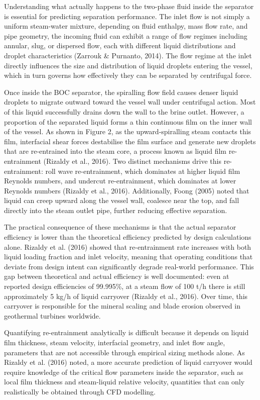 Understanding what actually happens to the two-phase fluid inside the separator is essential for predicting separation performance. The inlet flow is not simply a uniform steam-water mixture, depending on fluid enthalpy, mass flow rate, and pipe geometry, the incoming fluid can exhibit a range of flow regimes including annular, slug, or dispersed flow, each with different liquid distributions and droplet characteristics (Zarrouk \& Purnanto, 2014). The flow regime at the inlet directly influences the size and distribution of liquid droplets entering the vessel, which in turn governs how effectively they can be separated by centrifugal force.

Once inside the BOC separator, the spiralling flow field causes denser liquid droplets to migrate outward toward the vessel wall under centrifugal action. Most of this liquid successfully drains down the wall to the brine outlet. However, a proportion of the separated liquid forms a thin continuous film on the inner wall of the vessel. As shown in Figure 2, as the upward-spiralling steam contacts this film, interfacial shear forces destabilise the film surface and generate new droplets that are re-entrained into the steam core, a process known as liquid film re-entrainment (Rizaldy et al., 2016). Two distinct mechanisms drive this re-entrainment: roll wave re-entrainment, which dominates at higher liquid film Reynolds numbers, and undercut re-entrainment, which dominates at lower Reynolds numbers (Rizaldy et al., 2016). Additionally, Foong (2005) noted that liquid can creep upward along the vessel wall, coalesce near the top, and fall directly into the steam outlet pipe, further reducing effective separation.

The practical consequence of these mechanisms is that the actual separator efficiency is lower than the theoretical efficiency predicted by design calculations alone. Rizaldy et al. (2016) showed that re-entrainment rate increases with both liquid loading fraction and inlet velocity, meaning that operating conditions that deviate from design intent can significantly degrade real-world performance. This gap between theoretical and actual efficiency is well documented: even at reported design efficiencies of 99.995\%, at a steam flow of 100 t/h there is still approximately 5 kg/h of liquid carryover (Rizaldy et al., 2016). Over time, this carryover is responsible for the mineral scaling and blade erosion observed in geothermal turbines worldwide.

Quantifying re-entrainment analytically is difficult because it depends on liquid film thickness, steam velocity, interfacial geometry, and inlet flow angle, parameters that are not accessible through empirical sizing methods alone. As Rizaldy et al. (2016) noted, a more accurate prediction of liquid carryover would require knowledge of the critical flow parameters inside the separator, such as local film thickness and steam-liquid relative velocity, quantities that can only realistically be obtained through CFD modelling.

